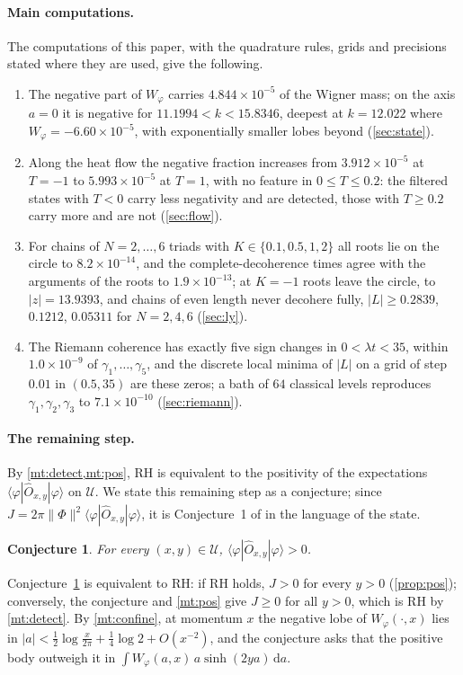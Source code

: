 \documentclass[11pt]{article}
\newtheorem{conjecture}{Conjecture}
\theoremstyle{definition}\newtheorem{definition}[theorem]{Definition}
\theoremstyle{remark}\newtheorem{remark}[theorem]{Remark}
\newcommand{\dd}{\,\mathrm d}\newcommand{\e}{\mathrm e}
\begin{document}
\paragraph{Main computations.} The computations of this paper, with the quadrature rules, grids and precisions stated where they are used, give the following.
\begin{enumerate}[label=(\arabic*)]
\item The negative part of $W_\varphi$ carries $4.844\times10^{-5}$ of the Wigner mass; on the axis $a=0$ it is negative for $11.1994<k<15.8346$, deepest at $k=12.022$ where $W_\varphi=-6.60\times10^{-5}$, with exponentially smaller lobes beyond (\cref{sec:state}).
\item Along the heat flow the negative fraction increases from $3.912\times10^{-5}$ at $T=-1$ to $5.993\times10^{-5}$ at $T=1$, with no feature in $0\le T\le0.2$: the filtered states with $T<0$ carry less negativity and are detected, those with $T\ge0.2$ carry more and are not (\cref{sec:flow}).
\item For chains of $N=2,\dots,6$ triads with $K\in\{0.1,0.5,1,2\}$ all roots lie on the circle to $8.2\times10^{-14}$, and the complete-decoherence times agree with the arguments of the roots to $1.9\times10^{-13}$; at $K=-1$ roots leave the circle, to $|z|=13.9393$, and chains of even length never decohere fully, $|L|\ge0.2839$, $0.1212$, $0.05311$ for $N=2,4,6$ (\cref{sec:ly}).
\item The Riemann coherence has exactly five sign changes in $0<\lambda t<35$, within $1.0\times10^{-9}$ of $\gamma_1,\dots,\gamma_5$, and the discrete local minima of $|L|$ on a grid of step $0.01$ in $(0.5,35)$ are these zeros; a bath of $64$ classical levels reproduces $\gamma_1,\gamma_2,\gamma_3$ to $7.1\times10^{-10}$ (\cref{sec:riemann}).
\end{enumerate}

\paragraph{The remaining step.} By \cref{mt:detect,mt:pos}, RH is equivalent to the positivity of the expectations $\langle\varphi|\hat O_{x,y}|\varphi\rangle$ on $\mathcal U$. We state this remaining step as a conjecture; since $J=2\pi\|\Phi\|^2\langle\varphi|\hat O_{x,y}|\varphi\rangle$, it is Conjecture~1 of \cite{SMath} in the language of the state.
\begin{conjecture}\label{conj:target}
For every $(x,y)\in\mathcal U$, $\langle\varphi|\hat O_{x,y}|\varphi\rangle>0$.
\end{conjecture}
Conjecture~\ref{conj:target} is equivalent to RH: if RH holds, $J>0$ for every $y>0$ (\cref{prop:pos}); conversely, the conjecture and \cref{mt:pos} give $J\ge0$ for all $y>0$, which is RH by \cref{mt:detect}. By \cref{mt:confine}, at momentum $x$ the negative lobe of $W_\varphi(\cdot,x)$ lies in $|a|<\frac12\log\frac x{2\pi}+\frac14\log2+O(x^{-2})$, and the conjecture asks that the positive body outweigh it in $\int W_\varphi(a,x)\,a\sinh(2ya)\dd a$.
\end{document}

